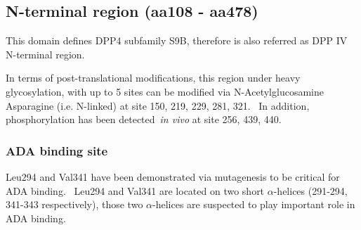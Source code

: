 \subsection{N-terminal region (aa108 - aa478)}

This domain defines DPP4 subfamily S9B, therefore is also referred as DPP IV N-terminal region. 

In terms of post-translational modifications, this region under heavy glycosylation, with up to 5 sites can be modified via N-Acetylglucosamine Asparagine (i.e. N-linked) at site 150, 219, 229, 281, 321.~\cite{Rasmussen2003,Thoma2003,Meng2010,Chen2009,Hiramatsu2003} In addition, phosphorylation has been detected~\textit{in vivo} at site 256, 439, 440.~\cite{Hornbeck2015,}

\subsubsection{ADA binding site}
Leu294 and Val341 have been demonstrated via mutagenesis to be critical for ADA binding.~\cite{Abbott_1999} Leu294 and Val341 are located on two short $\alpha$-helices (291-294, 341-343 respectively), those two $\alpha$-helices are suspected to play important role in ADA binding. 
